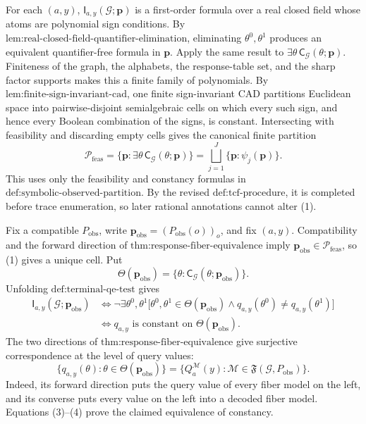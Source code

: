 For each \((a,y)\), \(\mathsf I_{a,y}(\mathcal G;\mathbf p)\) is a first-order formula over a real closed field whose atoms are polynomial sign conditions. By \(\text{lem:real-closed-field-quantifier-elimination}\), eliminating \(\theta^0,\theta^1\) produces an equivalent quantifier-free formula in \(\mathbf p\). Apply the same result to \(\exists\theta\,\mathsf C_{\mathcal G}(\theta;\mathbf p)\). Finiteness of the graph, the alphabets, the response-table set, and the sharp factor supports makes this a finite family of polynomials. By \(\text{lem:finite-sign-invariant-cad}\), one finite sign-invariant CAD partitions Euclidean space into pairwise-disjoint semialgebraic cells on which every such sign, and hence every Boolean combination of the signs, is constant. Intersecting with feasibility and discarding empty cells gives the canonical finite partition
\[
\mathcal P_{\mathrm{feas}}
=\{\mathbf p:\exists\theta\,\mathsf C_{\mathcal G}(\theta;\mathbf p)\}
=\bigsqcup_{j=1}^J\{\mathbf p:\psi_j(\mathbf p)\}.
\tag{1}
\]
This uses only the feasibility and constancy formulas in \(\text{def:symbolic-observed-partition}\). By the revised \(\text{def:tcf-procedure}\), it is completed before trace enumeration, so later rational annotations cannot alter (1).

Fix a compatible \(P_{\mathrm{obs}}\), write \(\mathbf p_{\mathrm{obs}}=(P_{\mathrm{obs}}(o))_o\), and fix \((a,y)\). Compatibility and the forward direction of \(\text{thm:response-fiber-equivalence}\) imply \(\mathbf p_{\mathrm{obs}}\in\mathcal P_{\mathrm{feas}}\), so (1) gives a unique cell. Put
\[
\Theta(\mathbf p_{\mathrm{obs}})
=\{\theta:\mathsf C_{\mathcal G}(\theta;\mathbf p_{\mathrm{obs}})\}.
\tag{2}
\]
Unfolding \(\text{def:terminal-qe-test}\) gives
\[
\begin{aligned}
\mathsf I_{a,y}(\mathcal G;\mathbf p_{\mathrm{obs}})
&\Longleftrightarrow
\neg\exists\theta^0,\theta^1
\bigl[\theta^0,\theta^1\in\Theta(\mathbf p_{\mathrm{obs}})
\wedge q_{a,y}(\theta^0)\neq q_{a,y}(\theta^1)\bigr]\\
&\Longleftrightarrow
q_{a,y}\text{ is constant on }\Theta(\mathbf p_{\mathrm{obs}}).
\end{aligned}
\tag{3}
\]
The two directions of \(\text{thm:response-fiber-equivalence}\) give surjective correspondence at the level of query values:
\[
\{q_{a,y}(\theta):\theta\in\Theta(\mathbf p_{\mathrm{obs}})\}
=\{Q_a^{\mathcal M}(y):\mathcal M\in\mathfrak F(\mathcal G,P_{\mathrm{obs}})\}.
\tag{4}
\]
Indeed, its forward direction puts the query value of every fiber model on the left, and its converse puts every value on the left into a decoded fiber model. Equations (3)--(4) prove the claimed equivalence of constancy.

